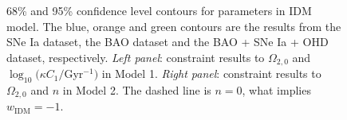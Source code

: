 \documentclass[twocolumn]{aastex631}
\begin{document}
   \begin{figure}
      \centering
      \caption{
         68\% and 95\% confidence level contours for parameters in 
         IDM model. The blue, orange and green contours are the results from
         the SNe Ia dataset, the BAO dataset and the BAO + SNe Ia + OHD dataset, respectively.
         \emph{Left panel}: constraint results to $\Omega_{2,0}$ and 
         $\log_{10}(\kappa C_1/$Gyr${}^{-1})$ in Model 1. 
         \emph{Right panel}: constraint results to $\Omega_{2,0}$ and $n$ in Model 2. 
         The dashed line is $n=0$, what implies $w_{\text{IDM}}=-1$.
      }
      \label{fig:1}
   \end{figure}
   
\end{document}
